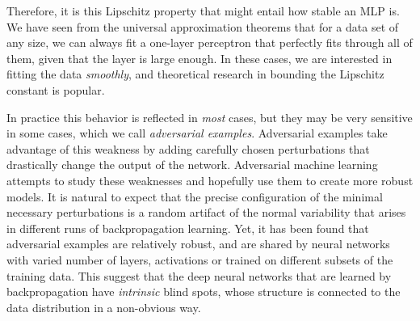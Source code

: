   Therefore, it is this Lipschitz property that might entail how stable an MLP is. We have seen from the universal approximation theorems that for a data set of any size, we can always fit a one-layer perceptron that perfectly fits through all of them, given that the layer is large enough. In these cases, we are interested in fitting the data \textit{smoothly}, and theoretical research in bounding the Lipschitz constant is popular.

  In practice this behavior is reflected in \textit{most} cases, but they may be very sensitive in some cases, which we call \textit{adversarial examples}. Adversarial examples take advantage of this weakness by adding carefully chosen perturbations that drastically change the output of the network. Adversarial machine learning attempts to study these weaknesses and hopefully use them to create more robust models. It is natural to expect that the precise configuration of the minimal necessary perturbations is a random artifact of the normal variability that arises in different runs of backpropagation learning. Yet, it has been found that adversarial examples are relatively robust, and are shared by neural networks with varied number of layers, activations or trained on different subsets of the training data. This suggest that the deep neural networks that are learned by backpropagation have \textit{intrinsic} blind spots, whose structure is connected to the data distribution in a non-obvious way. 

